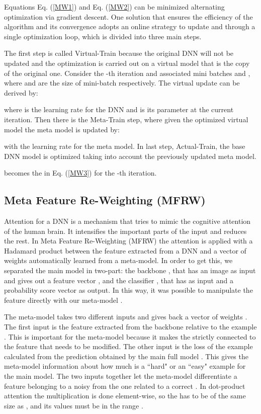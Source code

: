 \documentclass[runningheads]{llncs}
\begin{document}
	Equations Eq. (\ref{MW1}) and Eq. (\ref{MW2}) can be minimized alternating optimization via gradient descent. One solution that ensures the efficiency of the algorithm and its convergence \cite{shu2019meta} adopts an online strategy to update  and  through a single optimization loop, which is divided into three main steps.
	
	The first step is called Virtual-Train because the original DNN will not be updated and the optimization is carried out on a virtual model that is the copy of the original one. Consider the -th iteration and associated mini batches  and , where  and  are the size of mini-batch respectively. The virtual update can be derived by:
	
	where  is the learning rate for the DNN and  is its parameter at the current iteration. Then there is the Meta-Train step, where given the optimized virtual model the meta model is updated by:
	
	with  the learning rate for the meta model. In last step, Actual-Train, the base DNN model is optimized taking into account the previously updated meta model.
	
	 becomes the  in Eq. (\ref{MW3}) for the -th iteration.
	
	
	\subsection{Meta Feature Re-Weighting (MFRW)}\label{mfrw}
	
	Attention for a DNN is a mechanism that tries to mimic the cognitive attention of the human brain. It intensifies the important parts of the input and reduces the rest. In Meta Feature Re-Weighting (MFRW) the attention is applied with a Hadamard product between the feature extracted from a DNN and a vector of weights automatically learned from a meta-model. In order to get this, we separated the main model  in two-part: the backbone , that has an image  as input and gives out a feature vector , and the classifier , that has  as input and a probability score vector  as output. In this way, it was possible to manipulate the feature  directly with our meta-model .
	
	The meta-model takes two different inputs  and gives back a vector of weights . The first input  is the feature extracted from the backbone  relative to the example . This is important for the meta-model because it makes the  strictly connected to the feature that needs to be modified. The other input is the loss  of the example  calculated from the prediction obtained by the main full model . This gives the meta-model information about how much  is a ``hard" or an ``easy" example for the main model. The two inputs together let the meta-model differentiate a feature belonging to a noisy  from the one related to a correct . In dot-product attention the multiplication is done element-wise, so the  has to be of the same size as , and its values must be in the range .
	
\end{document}
